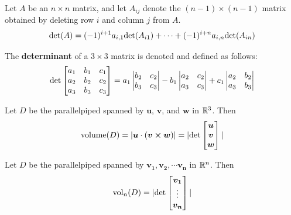 \begin{theorem}
    Let $A$ be an $n \times n$ matrix, and let $A_{ij}$ denote the $(n-1) \times (n-1)$ matrix obtained by deleting row $i$ and column $j$ from $A$.
    $$\textnormal{det}(A) = (-1)^{i+1}a_{i,1}\textnormal{det}(A_{i1}) + \cdots +  (-1)^{i+n}a_{i,n}\textnormal{det}(A_{in})$$
    
    \end{theorem}
    
    \begin{example}
    The \textbf{determinant} of a $3 \times 3$ matrix is denoted and defined as follows:
\begin{equation*}
\textnormal{det} 
\begin{bmatrix}
a_1 & b_1 & c_1 \\
a_2 & b_2 & c_2 \\
a_3 & b_3 & c_3 \\
\end{bmatrix} = a_1\begin{vmatrix}
b_2 & c_2 \\
b_3 & c_3
\end{vmatrix} - b_1\begin{vmatrix}
a_2 &  c_2 \\
a_3 &  c_3
\end{vmatrix} + c_1\begin{vmatrix}
a_2 & b_2 \\
a_3 & b_3 \\
\end{vmatrix}
\end{equation*}

    \end{example}


\begin{theorem}
    Let $D$ be the parallelpiped spanned by $\bm{u}$, $\bm{v}$, and $\bm{w}$ in $\mathbb{R}^3$.  Then
    \begin{equation*}
\textnormal{volume}(D) = |\bm{u} \cdot (\bm{v \times w})| = | \textnormal{det}
\begin{bmatrix}
\bm{u} \\
\bm{v} \\
\bm{w} \\
\end{bmatrix}|
\end{equation*}

    
    \end{theorem}

\begin{theorem}
    Let $D$ be the parallelpiped spanned by $\bm{v_1}, \bm{v_2}, \cdots \bm{v_n}$ in $\mathbb{R}^n$.  Then
    \begin{equation*}
\textnormal{vol}_n(D) = | \textnormal{det}
\begin{bmatrix}
\bm{v_1} \\
\vdots \\
\bm{v_n} \\
\end{bmatrix}|
\end{equation*}

    
    \end{theorem}

